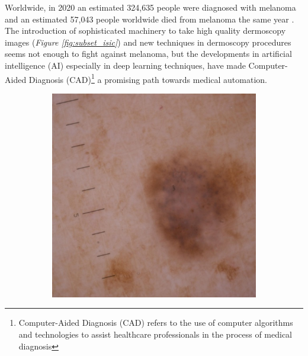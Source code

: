 Worldwide, in 2020 an estimated 324,635 people were diagnosed with melanoma and
an estimated 57,043 people worldwide died from melanoma the same year
\cite{CancerStats}. The introduction of sophisticated machinery to take high
quality dermoscopy images (\textit{Figure \ref{fig:subset_isic}}) and new
techniques in dermoscopy procedures seems not enough to fight against
melanoma, but the developments in artificial intelligence (AI) especially in
deep learning techniques, have made Computer-Aided Diagnosis
(CAD)\footnote{Computer-Aided Diagnosis (CAD) refers to the use of computer
algorithms and technologies to assist healthcare professionals in the process
of medical diagnosis} a promising path towards medical automation.

\begin{figure}[h!] \centering
  \begin{subfigure}{0.3\textwidth}
    \includegraphics[width=\textwidth]{imatges/introduction/subset_isic/ISIC_1752943.jpg}
  \end{subfigure}
  \hfill
  \begin{subfigure}{0.3\textwidth}

\end{subfigure}
\end{figure}
